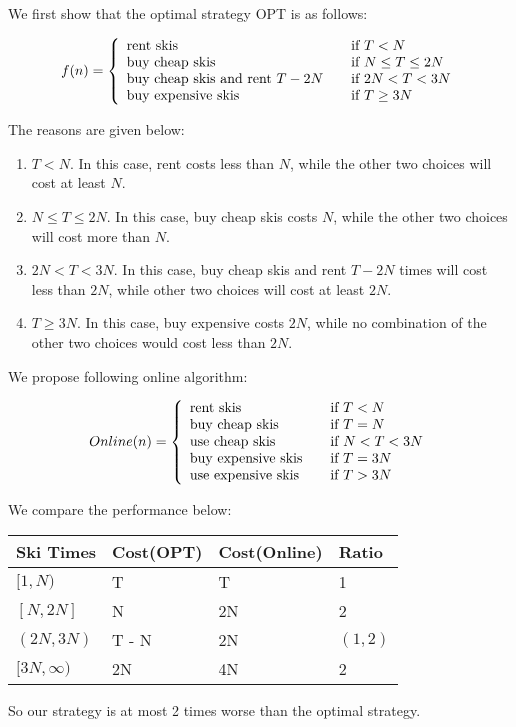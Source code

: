 We first show that the optimal strategy OPT is as follows:

\[ f(n) = \left\{
  \begin{array}{l l}
    \text{rent skis} & \quad \text{if $T < N$}  \\
    \text{buy cheap skis} & \quad \text{if $N \leq T \leq 2N$} \\
    \text{buy cheap skis and rent $T - 2N$} & \quad \text{if $2N < T < 3N$} \\
    \text{buy expensive skis} & \quad \text{if $T \geq 3N$}\\
  \end{array} \right.
\]

\noindent
The reasons are given below:

\begin{enumerate}
\item \textbf{$T < N$}. In this case, rent costs less than $N$, while the other two choices will cost at least $N$.

\item \textbf{$N \leq T \leq 2N$}. In this case, buy cheap skis costs $N$, while the other two choices will cost more than $N$.

\item \textbf{$2N < T < 3N$}. In this case, buy cheap skis and rent $T-2N$ times will cost less than $2N$, while other two choices will cost at least $2N$.

\item \textbf{$T \geq 3N$}. In this case, buy expensive costs $2N$, while no combination of the other two choices would cost less than $2N$.
\end{enumerate}

\noindent
We propose following online algorithm:

\[Online(n) = \left\{
  \begin{array}{l l}
    \text{rent skis} & \quad \text{if $T < N$}  \\
    \text{buy cheap skis} & \quad \text{if $T = N$}  \\
    \text{use cheap skis} & \quad \text{if $N < T < 3N$} \\
    \text{buy expensive skis} & \quad \text{if $T = 3N$} \\
    \text{use expensive skis} & \quad \text{if $T > 3N$}\\
  \end{array} \right.
\]

\noindent
We compare the performance below:

\begin{center}
\begin{tabular}{|l|l|l|l|}
  \hline
  Ski Times & Cost(OPT) & Cost(Online) & Ratio \\
  \hline
  $[1, N)$ & T & T & 1 \\
  \hline
  $[N, 2N]$ & N & 2N & 2 \\
  \hline
  $(2N, 3N)$ & T - N & 2N & $(1, 2)$ \\
  \hline
  $[3N, \infty)$ & 2N & 4N & 2 \\
  \hline
\end{tabular}
\end{center}

\noindent
So our strategy is at most 2 times worse than the optimal strategy.